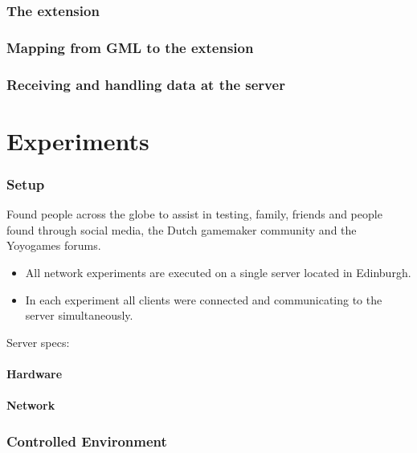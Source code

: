 \documentclass[12pt]{article}
\begin{document}
\section{The extension}

\section{Mapping from GML to the extension}

\section{Receiving and handling data at the server}


\pagebreak
\part{Experiments}
\pagebreak

\section{Setup}
Found people across the globe to assist in testing, family, friends and people found through social media, the Dutch gamemaker community and the Yoyogames forums.
\begin{itemize}
\item All network experiments are executed on a single server located in Edinburgh.
\item In each experiment all clients were connected and communicating to the server simultaneously.
\end{itemize}
Server specs:
\subsection{Hardware}
\subsection{Network}

\section{Controlled Environment}
\end{document}
